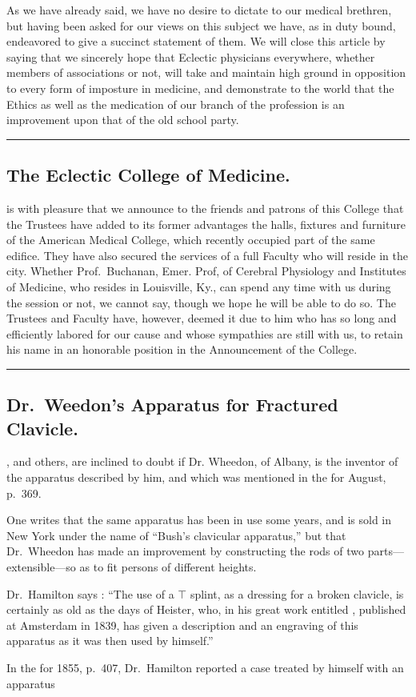 
As we have already said, we have no desire to dictate to our medical
brethren, but having been asked for our views on this subject we
have, as in duty bound, endeavored to give a succinct statement of them.
We will close this article by saying that we sincerely hope that Eclectic
physicians everywhere, whether members of associations or not, will
take and maintain high ground in opposition to every form of imposture
in medicine, and demonstrate to the world that the Ethics as well
as the medication of our branch of the profession is an improvement
upon that of the old school party.

\fancybreak{*}

\subsection*{The Eclectic College of Medicine.}

 is with pleasure that we announce to the friends and patrons of this
College that the Trustees have added to its former advantages the halls,
fixtures and furniture of the American Medical College, which recently
occupied part of the same edifice. They have also secured the services
of a full Faculty who will reside in the city. Whether Prof.~Buchanan,
Emer. Prof, of Cerebral Physiology and Institutes of Medicine, who
resides in Louisville, Ky., can spend any time with us during the session
or not, we cannot say, though we hope he will be able to do so. The
Trustees and Faculty have, however, deemed it due to him who has so
long and efficiently labored for our cause and whose sympathies are still
with us, to retain his name in an honorable position in the Announcement
of the College.

\fancybreak{*}

\subsection*{Dr.\ Weedon's Apparatus for Fractured Clavicle.}

, and others, are inclined to doubt if Dr.
Wheedon, of Albany, is the inventor of the apparatus described by him,
and which was mentioned in the  for August, p.\ 369.

One writes that the same apparatus has been in use some years, and
is sold in New York under the name of ``Bush's clavicular apparatus,''
but that Dr.\ Wheedon has made an improvement by constructing the
rods of two parts---extensible---so as to fit persons of different heights.

Dr.\ Hamilton says : ``The use of a $\top$ splint, as a dressing for a broken
clavicle, is certainly as old as the days of Heister, who, in his great work
entitled , published at Amsterdam in 1839, has
given a description and an engraving of this apparatus as it was then
used by himself.''

In the  for 1855,
p.~407, Dr.\ Hamilton reported a case treated by himself with an apparatus\endinput

